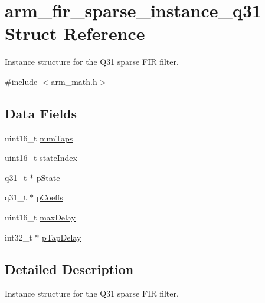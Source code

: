 \hypertarget{structarm__fir__sparse__instance__q31}{\section{arm\-\_\-fir\-\_\-sparse\-\_\-instance\-\_\-q31 Struct Reference}
\label{structarm__fir__sparse__instance__q31}
}


Instance structure for the Q31 sparse F\-I\-R filter.  




{\ttfamily \#include $<$arm\-\_\-math.\-h$>$}

\subsection*{Data Fields}
\begin{DoxyCompactItemize}
\item 
uint16\-\_\-t \hyperlink{structarm__fir__sparse__instance__q31_a751941891e47f522a7f5375fe8990aac}{num\-Taps}
\item 
uint16\-\_\-t \hyperlink{structarm__fir__sparse__instance__q31_a566a0cb53437e48b9a3bf18e5b03d8aa}{state\-Index}
\item 
q31\-\_\-t $\ast$ \hyperlink{structarm__fir__sparse__instance__q31_adee4ba3ee8869865af7d8fa08ca913d6}{p\-State}
\item 
q31\-\_\-t $\ast$ \hyperlink{structarm__fir__sparse__instance__q31_a68888e36167d81cb7836db10367a1682}{p\-Coeffs}
\item 
uint16\-\_\-t \hyperlink{structarm__fir__sparse__instance__q31_ab25f4ee7550e6d92acff77ada283733f}{max\-Delay}
\item 
int32\-\_\-t $\ast$ \hyperlink{structarm__fir__sparse__instance__q31_adec00b3793ab4f08edfeb4ea6a9eb6e6}{p\-Tap\-Delay}
\end{DoxyCompactItemize}


\subsection{Detailed Description}
Instance structure for the Q31 sparse F\-I\-R filter. 

